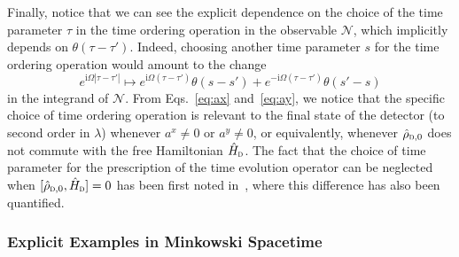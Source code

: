 \documentclass[letterpaper,12pt,titlepage,oneside,final]{book}
\newcommand{\ii}{\mathrm{i}}
\newcommand{\tc}[1]{\textsc{#1}}
\newcommand{\trr}[1]{\textcolor{red}{#1}}
\begin{document}
Finally, notice that we can see the explicit dependence on the choice of the time parameter $\tau$ in the time ordering operation in the observable $\mathcal{N}$, which implicitly depends on $\theta(\tau - \tau')$. Indeed, choosing another time parameter $s$ for the time ordering operation would amount to the change
\begin{equation}
    e^{\ii \Omega|\tau-\tau'|} \longmapsto e^{\ii \Omega(\tau - \tau')}\theta(s-s') + e^{-\ii \Omega(\tau - \tau')}\theta(s'-s)
\end{equation}
in the integrand of $\mathcal{N}$. From Eqs.~\eqref{eq:ax} and~\eqref{eq:ay}, we notice that the specific choice of time ordering operation is relevant to the final state of the detector (to second order in $\lambda$) whenever $a^x\neq 0$ or $a^y\neq 0$, or equivalently, whenever $\hat{\rho}_{\tc{d},0}$ does not commute with the free Hamiltonian $\hat{H}_\tc{d}$. The fact that the choice of time parameter for the prescription of the time evolution operator can be neglected when $[\hat{\rho}_{\tc{d},0},\hat{H}_\tc{d}] = 0$ has been first noted in~\cite{us2}, where this difference has also been quantified. 







\subsubsection*{Explicit Examples in Minkowski Spacetime}
\end{document}

